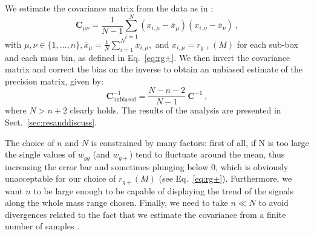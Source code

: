 \documentclass[a4paper,fleqn,usenatbib]{mnras}
\begin{document}
We estimate the covariance matrix from the data as in \citet{Tayloretal2013}:
\begin{equation}
     \mathbf{C}_{\mu \nu} = \frac{1}{N-1} \sum_{i = 1}^{N} (x_{i, \mu} - \overline{x}_{\mu})(x_{i, \nu} - \overline{x}_{\nu}) \ ,
	\label{eq:covariance}
\end{equation}
with $\mu, \nu \in \{1, \dotso, n\}, \overline{x}_{\mu} = \frac{1}{N} \sum_{i=1}^{N} x_{i, \mu},$ and $x_{i, \mu}= r_{g+}(M)$ for each sub-box and each mass bin, as defined in Eq.~\ref{eq:rg+}. We then invert the covariance matrix and correct the bias on the inverse to obtain an unbiased estimate of the precision matrix, given by:
\begin{equation}
     \mathbf{C}^{-1}_{\mbox{unbiased}} = \frac{N - n -2}{N-1} \  \mathbf{C}^{-1} \ ,
	\label{eq:precunbiased}
\end{equation}
where $N > n+2$ clearly holds. The results of the analysis are presented in Sect.~\ref{sec:resanddiscuss}.

The choice of $n$ and $N$ is constrained by many factors: first of all, if N is too large the single values of $w_{gg}$ (and $w_{g+}$) tend to fluctuate around the mean, thus increasing the error bar and sometimes plunging below 0, which is obviously unacceptable for our choice of $ r_{g+} (M)$ (see Eq.~\ref{eq:rg+}). Furthermore, we want $n$ to be large enough to be capable of displaying the trend of the signals along the whole mass range chosen. Finally, we need to take $n \ll N$ to avoid divergences related to the fact that we estimate the covariance from a finite number of samples \citep{Tayloretal2013}.
\end{document}
